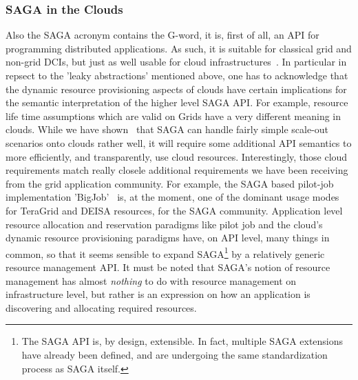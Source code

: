 \documentclass[10pt,conference,final,letterpaper,twoside,twocolumn,]{IEEEtran}
\newcommand{\I}[1]{\textit{#1}}
\begin{document}
 \subsubsection*{SAGA in the Clouds}

  Also the SAGA acronym contains the G-word, it is, first of all, an
  API for programming distributed applications.  As such, it is
  suitable for classical grid and non-grid DCIs, but just as well
  usable for cloud infrastructures~\cite{sagacloud...}.  In particular
  in repsect to the 'leaky abstractions' mentioned above, one has to
  acknowledge that the dynamic resource provisioning aspects of clouds
  have certain implications for the semantic interpretation of the
  higher level SAGA API.  For example, resource life time assumptions
  which are valid on Grids have a very different meaning in clouds.
  While we have shown~\cite{sagacloud...} that SAGA can handle fairly
  simple scale-out scenarios onto clouds rather well, it will require
  some additional API semantics to more efficiently, and
  transparently, use cloud resources.  Interestingly, those cloud
  requirements match really closele additional requirements we have
  been receiving from the grid application community.  For example,
  the SAGA based pilot-job implementation 'BigJob'~\cite{bigjob} is,
  at the moment, one of the dominant usage modes for TeraGrid and
  DEISA resources, for the SAGA community.  Application level resource
  allocation and reservation paradigms like pilot job and the cloud's
  dynamic resource provisioning paradigms have, on API level, many
  things in common, so that it seems sensible to expand
  SAGA\footnote{The SAGA API is, by design, extensible.  In fact,
  multiple SAGA extensions have already been defined, and are
  undergoing the same standardization process as SAGA itself.} by a
  relatively generic resource management API.  It must be noted that
  SAGA's notion of resource management has almost \I{nothing} to do
  with resource management on infrastructure level, but rather is an
  expression on how an application is discovering and allocating
  required resources.
  

\end{document}
